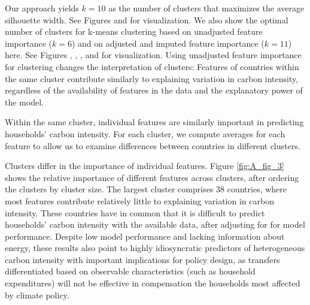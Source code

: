 \documentclass[12pt, a4paper]{article}
\begin{document}
\begin{refsection}
Our approach yields $k = 10$ as the number of clusters that maximizes the average silhouette width. See Figures  and  for visualization. We also show the optimal number of clusters for k-means clustering based on unadjusted feature importance ($k = 6$) and on adjusted and imputed feature importance ($k=11$) here. See Figures , , , and  for visualization. Using unadjusted feature importance for clustering changes the interpretation of clusters: Features of countries within the same cluster contribute similarly to explaining variation in carbon intensity, regardless of the availability of features in the data and the explanatory power of the model.

Within the same cluster, individual features are similarly important in predicting households' carbon intensity. For each cluster, we compute averages for each feature to allow us to examine differences between countries in different clusters.%

Clusters differ in the importance of individual features. Figure \ref{fig:A_fig_3} shows the relative importance of different features across clusters, after ordering the clusters by cluster size. The largest cluster comprises 38 countries, where most features contribute relatively little to explaining variation in carbon intensity. These countries have in common that it is difficult to predict households' carbon intensity with the available data, after adjusting for for model performance. Despite low model performance and lacking information about energy, these results also point to highly idiosyncratic predictors of heterogeneous carbon intensity with important implications for policy design, as transfers differentiated based on observable characteristics (such as household expenditures) will not be effective in compensation the households most affected by climate policy.


\end{refsection}
\end{document}
